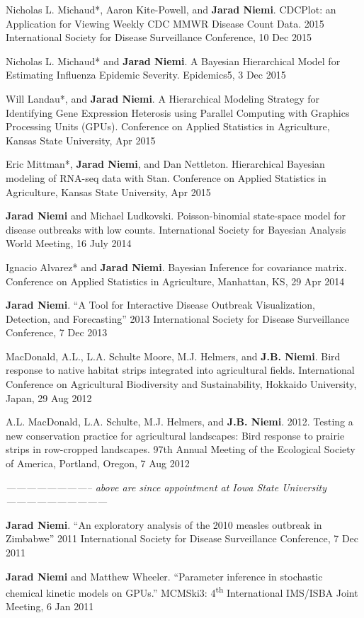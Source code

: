 \documentclass[overlapped,line]{res}
\newcommand{\sinceappt}{\emph{-------------------------- above are since appointment at Iowa State University ------------------------------}}
\newcommand{\sinceappt}{}
\begin{document}
\begin{resume}
{\small

Nicholas L. Michaud*, Aaron Kite-Powell, and {\bf Jarad Niemi}. CDCPlot: an Application for Viewing Weekly CDC MMWR Disease Count Data. 2015 International Society for Disease Surveillance Conference, 10 Dec 2015

Nicholas L. Michaud* and {\bf Jarad Niemi}. A Bayesian Hierarchical Model for Estimating Influenza Epidemic Severity. Epidemics5, 3 Dec 2015

Will Landau*, and {\bf Jarad Niemi}. A Hierarchical Modeling Strategy for Identifying Gene Expression Heterosis using Parallel Computing with Graphics Processing Units (GPUs). Conference on Applied Statistics in Agriculture, Kansas State University, Apr 2015

Eric Mittman*, {\bf Jarad Niemi}, and Dan Nettleton. Hierarchical Bayesian modeling of RNA-seq data with Stan. Conference on Applied Statistics in Agriculture, Kansas State University, Apr 2015

{\bf Jarad Niemi} and Michael Ludkovski. Poisson-binomial state-space model for disease outbreaks with low counts. International Society for Bayesian Analysis World Meeting, 16 July 2014 


Ignacio Alvarez* and {\bf Jarad Niemi}. Bayesian Inference for covariance matrix. Conference on Applied Statistics in Agriculture, Manhattan, KS, 29 Apr 2014 

{\bf Jarad Niemi}. ``A Tool for Interactive Disease Outbreak Visualization, Detection, and Forecasting'' 2013 International Society for Disease Surveillance Conference, 7 Dec 2013

MacDonald, A.L., L.A. Schulte Moore, M.J. Helmers, and {\bf J.B. Niemi}.  Bird response to native habitat strips integrated into agricultural fields.  International Conference on Agricultural Biodiversity and Sustainability, Hokkaido University, Japan,  29 Aug 2012 

A.L. MacDonald, L.A. Schulte, M.J. Helmers, and {\bf J.B. Niemi}.  2012.  Testing a new conservation practice for agricultural landscapes: Bird response to prairie strips in row-cropped landscapes.  97th Annual Meeting of the Ecological Society of America, Portland, Oregon, 7 Aug 2012 

\sinceappt

{\bf Jarad Niemi}. ``An exploratory analysis of the 2010 measles outbreak in Zimbabwe'' 2011 International Society for Disease Surveillance Conference, 7 Dec 2011 

{\bf Jarad Niemi} and Matthew Wheeler. ``Parameter inference in stochastic chemical kinetic models on GPUs.'' MCMSki3: 4\textsuperscript{th} International IMS/ISBA Joint Meeting, 6 Jan 2011

}
\end{resume}
\end{document}
